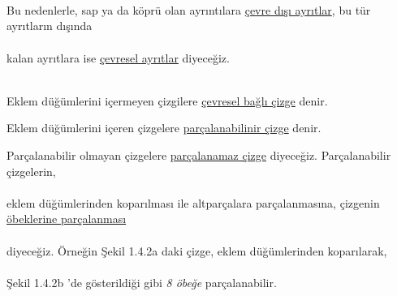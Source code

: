 \documentclass{amsbook}
\begin{document}
\setcounter{chapter}{1}
\\
\noindent\makebox[\linewidth]{\rule{\paperwidth}{0.4pt}} %
\\ \\
\noindent Bu nedenlerle, sap ya da köprü olan ayrıntılara \underline{çevre dışı ayrıtlar}, 
bu tür ayrıtların dışında \\ \\ kalan ayrıtlara ise \underline{çevresel ayrıtlar} diyeceğiz. \\ \\
\begin{definition}
Eklem düğümlerini içermeyen çizgilere \underline{çevresel bağlı çizge} denir.\\
\end{definition}
\begin{definition}
Eklem düğümlerini içeren çizgelere \underline{parçalanabilinir çizge} denir.\\
\end{definition}


Parçalanabilir olmayan çizgelere \underline{parçalanamaz çizge} diyeceğiz. Parçalanabilir çizgelerin, \\ \\ eklem düğümlerinden koparılması ile altparçalara parçalanmasına, çizgenin \underline{öbeklerine parçalanması} \\ \\ diyeceğiz. Örneğin Şekil 1.4.2a daki çizge, eklem düğümlerinden koparılarak, \\ \\ Şekil 1.4.2b 'de gösterildiği gibi \textit{8 öbeğe} parçalanabilir.  \\ \\
\end{document}
